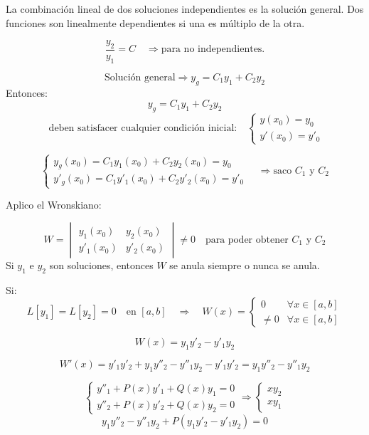 \documentclass[a4paper,12pt]{article}
\begin{document}
\newpage
\noindent
La combinación lineal de dos soluciones independientes es la solución general.  
Dos funciones son linealmente dependientes si una es múltiplo de la otra.

\[
\frac{y_2}{y_1 } = C  \quad \Longrightarrow \text{para no independientes.}
\]

\[
\text{Solución general} \Rightarrow y_g = C_1 y_1 + C_2 y_2
\]
Entonces: 
\[
y_g = C_1 y_1 + C_2 y_2 
\]
\[
\text{ deben satisfacer cualquier condición inicial:} 
\quad 
\begin{cases}
y(x_0) = y_0 \\
y'(x_0) = y'_0
\end{cases}
\]


\[
\begin{cases}
y_g(x_0) = C_1 y_1(x_0) + C_2 y_2(x_0) = y_0 \\
y'_g(x_0) = C_1 y'_1(x_0) + C_2 y'_2(x_0) = y'_0
\end{cases}
\quad \Rightarrow \text{saco } C_1 \text{ y } C_2
\]

\bigskip
\noindent
Aplico el Wronskiano:

\[
W = 
\begin{vmatrix}
y_1(x_0) & y_2(x_0) \\
y'_1(x_0) & y'_2(x_0)
\end{vmatrix}
\neq 0
\quad \text{para poder obtener } C_1 \text{ y } C_2
\]
Si \( y_1 \) e \( y_2 \) son soluciones, entonces \( W \) se anula siempre o nunca se anula.

\medskip
\noindent
Si:
\[
L[y_1] = L[y_2] = 0 \quad \text{en } [a,b] 
\quad \Rightarrow \quad 
W(x) = 
\begin{cases}
0 & \forall x \in [a,b] \\
\neq 0 & \forall x \in [a,b]
\end{cases}
\]

\[
W(x) = y_1 y'_2 - y'_1 y_2
\]

\[
W'(x) = y'_1 y'_2 + y_1 y''_2 - y''_1 y_2 - y'_1 y'_2 = y_1 y''_2 - y''_1 y_2
\]

\[
\begin{cases}
y''_1 + P(x)y'_1 + Q(x)y_1 = 0 \\
y''_2 + P(x)y'_2 + Q(x)y_2 = 0
\end{cases}
\Rightarrow 
\begin{cases}
xy_2 \\
xy_1
\end{cases}
\]
\vspace{1 em}
\[
y_1 y''_2 - y''_1 y_2 + P(y_1 y'_2 - y'_1 y_2) = 0
\]
\end{document}
